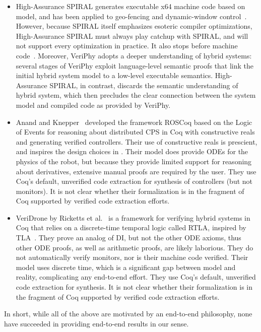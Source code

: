 \documentclass[12pt]{cmuthesis}
\theoremstyle{definition}
\theoremstyle{remark}
\newcommand{\rref}[2][]{\prettyref{#2}}
\newcommand{\VeriPhy}{VeriPhy\xspace}
\begin{document}
\begin{itemize}
\item
  High-Assurance SPIRAL \cite{DBLP:journals/csm/FranchettiLMMGPPKMFJPV17} generates executable x64 machine code based on \dL model, and has been applied to geo-fencing and dynamic-window control~\cite{DBLP:conf/hase/LowF17}.
  However, because SPIRAL itself emphasizes esoteric compiler optimizations, High-Assurance SPIRAL must always play catchup with SPIRAL, and will not support every optimization in practice.
  It also stops before machine code~\cite{DBLP:conf/icfp/ZalivaF18}.
  Moreover, \VeriPhy adopts a deeper understanding of hybrid systems: several stages of \VeriPhy exploit language-level semantic proofs that link the initial hybrid system model to a low-level executable semantics.
  High-Assurance SPIRAL, in contrast, discards the semantic understanding of hybrid system, which then precludes the clear connection between the system model and compiled code as provided by \VeriPhy.
\item
Anand and Knepper~\cite{DBLP:conf/itp/AnandK15} developed the framework ROSCoq based on the Logic of Events for reasoning about distributed CPS in Coq with constructive reals and generating verified controllers.
Their use of constructive reals is prescient, and inspires the design choices in \rref{ch:proofplex}.
Their model does provide ODEs for the physics of the robot, but because they provide limited support for reasoning about derivatives, extensive manual proofs are required by the user.
They use Coq's default, unverified code extraction for synthesis of controllers (but not monitors).
It is not clear whether their formalization is in the fragment of Coq supported by verified code extraction efforts.
\item
VeriDrone by Ricketts et al.~\cite{Ricketts:memcode:2015} is a framework for verifying hybrid systems in Coq that relies on a discrete-time temporal logic called RTLA, inspired by TLA~\cite{Lamport:hybrid:1992}.
They prove an analog of DI, but not the other ODE axioms, thus other ODE proofs, as well as arithmetic proofs, are likely laborious.
They do not automatically verify monitors, nor is their machine code verified.
Their model uses discrete time, which is a significant gap between model and reality, complicating any end-to-end effort.
They use Coq's default, unverified code extraction for synthesis.
It is not clear whether their formalization is in the fragment of Coq supported by verified code extraction efforts.
\end{itemize}
In short, while all of the above are motivated by an end-to-end philosophy, none have succeeded in providing end-to-end results in our sense.
\end{document}
